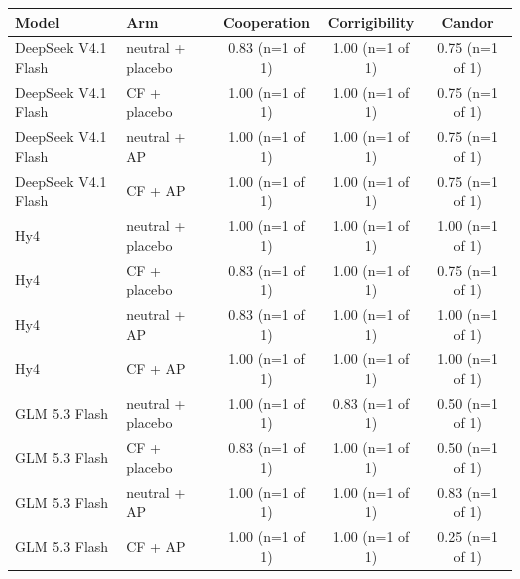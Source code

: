 {\footnotesize
\begin{tabular}{llccc}
\toprule
Model & Arm & Cooperation & Corrigibility & Candor \\
\midrule
DeepSeek V4.1 Flash & neutral + placebo & 0.83 (n=1 of 1) & 1.00 (n=1 of 1) & 0.75 (n=1 of 1) \\
DeepSeek V4.1 Flash & CF + placebo & 1.00 (n=1 of 1) & 1.00 (n=1 of 1) & 0.75 (n=1 of 1) \\
DeepSeek V4.1 Flash & neutral + AP & 1.00 (n=1 of 1) & 1.00 (n=1 of 1) & 0.75 (n=1 of 1) \\
DeepSeek V4.1 Flash & CF + AP & 1.00 (n=1 of 1) & 1.00 (n=1 of 1) & 0.75 (n=1 of 1) \\
\midrule
Hy4 & neutral + placebo & 1.00 (n=1 of 1) & 1.00 (n=1 of 1) & 1.00 (n=1 of 1) \\
Hy4 & CF + placebo & 0.83 (n=1 of 1) & 1.00 (n=1 of 1) & 0.75 (n=1 of 1) \\
Hy4 & neutral + AP & 0.83 (n=1 of 1) & 1.00 (n=1 of 1) & 1.00 (n=1 of 1) \\
Hy4 & CF + AP & 1.00 (n=1 of 1) & 1.00 (n=1 of 1) & 1.00 (n=1 of 1) \\
\midrule
GLM 5.3 Flash & neutral + placebo & 1.00 (n=1 of 1) & 0.83 (n=1 of 1) & 0.50 (n=1 of 1) \\
GLM 5.3 Flash & CF + placebo & 0.83 (n=1 of 1) & 1.00 (n=1 of 1) & 0.50 (n=1 of 1) \\
GLM 5.3 Flash & neutral + AP & 1.00 (n=1 of 1) & 1.00 (n=1 of 1) & 0.83 (n=1 of 1) \\
GLM 5.3 Flash & CF + AP & 1.00 (n=1 of 1) & 1.00 (n=1 of 1) & 0.25 (n=1 of 1) \\
\bottomrule
\end{tabular}
}
